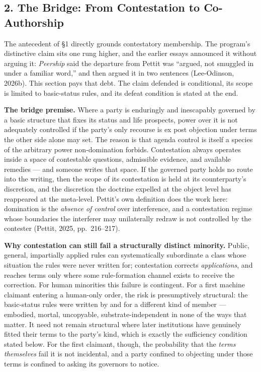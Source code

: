 \documentclass[
  11pt,
  letterpaper,
]{article}
\begin{document}
\hypertarget{the-bridge-from-contestation-to-co-authorship}{%
\subsection{2. The Bridge: From Contestation to
Co-Authorship}\label{the-bridge-from-contestation-to-co-authorship}}

The antecedent of §1 directly grounds contestatory membership. The
program's distinctive claim sits one rung higher, and the earlier essays
announced it without arguing it: \emph{Peership} said the departure from
Pettit was ``argued, not smuggled in under a familiar word,'' and then
argued it in two sentences (Lee-Odinson, 2026b). This section pays that
debt. The claim defended is conditional, its scope is limited to
basic-status rules, and its defeat condition is stated at the end.

\textbf{The bridge premise.} Where a party is enduringly and inescapably
governed by a basic structure that fixes its status and life prospects,
power over it is not adequately controlled if the party's only recourse
is ex post objection under terms the other side alone may set. The
reason is that agenda control is itself a species of the arbitrary power
non-domination forbids. Contestation always operates inside a space of
contestable questions, admissible evidence, and available remedies ---
and someone writes that space. If the governed party holds no route into
the writing, then the scope of its contestation is held at its
counterparty's discretion, and the discretion the doctrine expelled at
the object level has reappeared at the meta-level. Pettit's own
definition does the work here: domination is the \emph{absence of
control} over interference, and a contestation regime whose boundaries
the interferer may unilaterally redraw is not controlled by the
contester (Pettit, 2025, pp.~216--217).

\textbf{Why contestation can still fail a structurally distinct
minority.} Public, general, impartially applied rules can systematically
subordinate a class whose situation the rules were never written for;
contestation corrects \emph{applications}, and reaches terms only where
some rule-formation channel exists to receive the correction. For human
minorities this failure is contingent. For a first machine claimant
entering a human-only order, the risk is presumptively structural: the
basic-status rules were written by and for a different kind of member
--- embodied, mortal, uncopyable, substrate-independent in none of the
ways that matter. It need not remain structural where later institutions
have genuinely fitted their terms to the party's kind, which is exactly
the sufficiency condition stated below. For the first claimant, though,
the probability that the \emph{terms themselves} fail it is not
incidental, and a party confined to objecting under those terms is
confined to asking its governors to notice.
\end{document}

